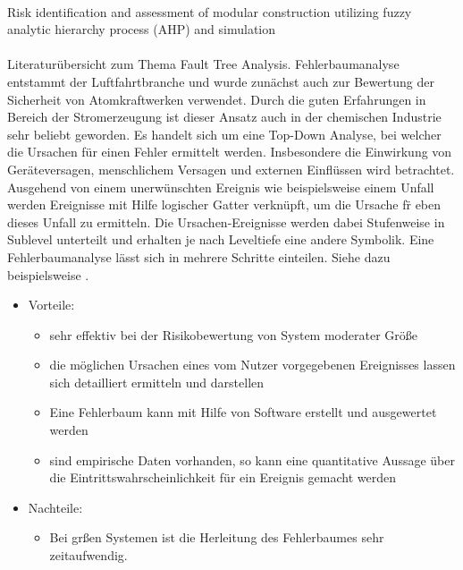 \paragraph*{\cite{Li_2013}} Risk identification and assessment of modular construction utilizing fuzzy analytic hierarchy process (AHP) and simulation

\paragraph*{\cite{Baig_2013}} Literatur\"ubersicht zum Thema \glqq Fault Tree Analysis\grqq { }. \hfill \newline
Fehlerbaumanalyse entstammt der Luftfahrtbranche und wurde zun\"achst auch zur Bewertung der Sicherheit von Atomkraftwerken verwendet. Durch die guten Erfahrungen in Bereich der Stromerzeugung ist dieser Ansatz auch in der chemischen Industrie sehr beliebt geworden. Es handelt sich um eine Top-Down Analyse, bei welcher die Ursachen f\"ur einen Fehler ermittelt werden. Insbesondere die Einwirkung von Ger\"ateversagen, menschlichem Versagen und externen Einfl\"ussen wird betrachtet. Ausgehend von einem unerw\"unschten Ereignis wie beispielsweise einem Unfall werden Ereignisse mit Hilfe logischer Gatter verkn\"upft, um die Ursache f\"r eben dieses Unfall zu ermitteln. Die Ursachen-Ereignisse werden dabei Stufenweise in Sublevel unterteilt und erhalten je nach Leveltiefe eine andere Symbolik. Eine Fehlerbaumanalyse l\"asst sich in mehrere Schritte einteilen. Siehe dazu beispielsweise \cite{Ayyub_2014}. \begin{itemize}
\item Vorteile: 
  \begin{itemize}
  \item sehr effektiv bei der Risikobewertung von System moderater Gr\"o\ss{}e
  \item die m\"oglichen Ursachen eines vom Nutzer vorgegebenen Ereignisses lassen sich detailliert ermitteln und darstellen
  \item Eine Fehlerbaum kann mit Hilfe von Software erstellt und ausgewertet werden
  \item sind empirische Daten vorhanden, so kann eine quantitative Aussage \"uber die Eintrittswahrscheinlichkeit f\"ur ein Ereignis gemacht werden
  \end{itemize}
\item Nachteile: 
  \begin{itemize}
  \item Bei gr\ss{}en Systemen ist die Herleitung des Fehlerbaumes sehr zeitaufwendig. 

\end{itemize}
\end{itemize}
